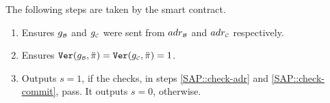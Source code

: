 \begin{enumerate}
 
 The following steps are taken   by  the smart contract.
   \begin{enumerate}
   
\item\label{SAP::check-adr} Ensures $g_{\scriptscriptstyle\mathcal B}$ and $g_{\scriptscriptstyle\mathcal C}$ were sent from   $adr_{\scriptscriptstyle \mathcal{B}}$ and  $adr_{\scriptscriptstyle \mathcal{C}}$  respectively. 
  
   \item\label{SAP::check-commit} Ensures $\mathtt{Ver}(g_{\scriptscriptstyle\mathcal B},\ddot{\pi})=\mathtt{Ver}(g_{\scriptscriptstyle\mathcal C},\ddot{\pi}) =1$.
   
   \item Outputs $s=1$, if the checks, in steps \ref{SAP::check-adr} and \ref{SAP::check-commit}, pass. It outputs $s=0$, otherwise.
    \end{enumerate}
 \end{enumerate}

  
  
  
  
%



